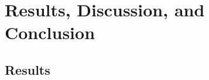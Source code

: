 \documentclass[xcolor=dvipsnames]{beamer}
\begin{document}
\section{Results, Discussion, and Conclusion}
\subsection{Results}


\end{document}
